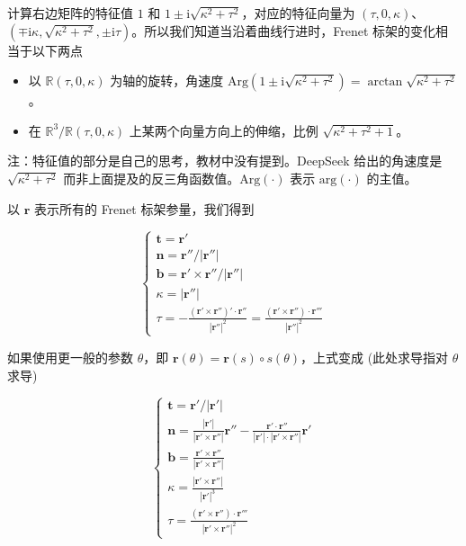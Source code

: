 \documentclass[a4paper, 12pt]{article}
\begin{document}
    计算右边矩阵的特征值 $1$ 和 $1\pm \mathrm i\sqrt{\kappa^2 + \tau^2}$，对应的特征向量为 $(\tau,0,\kappa)$、$(\mp \mathrm{i}\kappa,\sqrt{\kappa^2 + \tau^2},\pm\mathrm i\tau)$。所以我们知道当沿着曲线行进时，Frenet 标架的变化相当于以下两点

    \begin{itemize}
        \item 以 $\mathbb R (\tau,0,\kappa)$ 为轴的旋转，角速度 $\mathrm {Arg}(1\pm\mathrm{i}\sqrt{\kappa^2 + \tau^2})=\arctan \sqrt{\kappa^2 + \tau^2}$。
        \item 在 $\mathbb R^3/\mathbb R (\tau,0,\kappa)$ 上某两个向量方向上的伸缩，比例 $\sqrt{\kappa^2 + \tau^2+1}$。
    \end{itemize}

    注：特征值的部分是自己的思考，教材中没有提到。DeepSeek 给出的角速度是 $\sqrt{\kappa^2 + \tau^2}$ 而非上面提及的反三角函数值。$\mathrm {Arg}(\cdot)$ 表示 $\mathrm{arg}(\cdot)$ 的主值。

    以 $\boldsymbol r$ 表示所有的 Frenet 标架参量，我们得到

    \begin{equation}
    \begin{cases}
        \boldsymbol t = \boldsymbol r' \\
        \boldsymbol n = \boldsymbol r''/|\boldsymbol r''| \\
        \boldsymbol b = \boldsymbol r' \times \boldsymbol r''/|\boldsymbol r''| \\
        \kappa = |\boldsymbol r''| \\
        \tau = -\frac{(\boldsymbol r' \times \boldsymbol r'')' \cdot \boldsymbol r''}{|\boldsymbol r''|^2}=\frac{(\boldsymbol r' \times \boldsymbol r'') \cdot \boldsymbol r'''}{|\boldsymbol r''|^2}
    \end{cases}
    \end{equation}

    如果使用更一般的参数 $\theta$，即 $\boldsymbol r(\theta)=\boldsymbol r(s) \circ s(\theta)$，上式变成 (此处求导指对 $\theta$ 求导)

    \begin{equation}
    \begin{cases}
        \boldsymbol t = \boldsymbol r'/|\boldsymbol r'| \\
        \boldsymbol n = \frac{|\boldsymbol r'|}{|\boldsymbol r'\times \boldsymbol r''|} \boldsymbol r''-\frac{\boldsymbol r'\cdot \boldsymbol r''}{|\boldsymbol r'|\cdot|\boldsymbol r'\times \boldsymbol r''|}\boldsymbol r' \\
        \boldsymbol b = \frac{\boldsymbol r'\times \boldsymbol r''}{|\boldsymbol r'\times \boldsymbol r''|} \\
        \kappa = \frac{|\boldsymbol r'\times \boldsymbol r''|}{|\boldsymbol r'|^3} \\
        \tau = \frac{(\boldsymbol r' \times \boldsymbol r'') \cdot \boldsymbol r'''}{|\boldsymbol r'\times \boldsymbol r''|^2}
    \end{cases}
    \end{equation}
\end{document}
